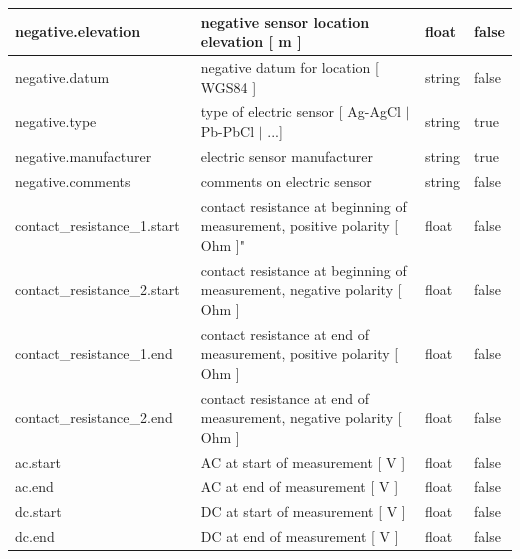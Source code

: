 \documentclass{article}
\begin{document}
\begin{table}[htb!]
\begin{tabular}{|l|p{3in}|l|l|}
        negative.elevation\ & negative sensor location elevation [ m ] & float & false \\ \hline
        negative.datum\ & negative datum for location [ WGS84 ] & string & false \\ \hline
        negative.type\ & type of electric sensor [ Ag-AgCl $|$ Pb-PbCl $|$ ...] & string & true \\ \hline
        negative.manufacturer\ & electric sensor manufacturer & string & true \\ \hline
        negative.comments\ & comments on electric sensor & string & false \\ \hline
        contact\_resistance\_1.start\ & contact resistance at beginning of measurement, positive polarity [ Ohm ]" & float & false \\ \hline
        contact\_resistance\_2.start\ & contact resistance at beginning of measurement, negative polarity [ Ohm ] & float & false \\ \hline
        contact\_resistance\_1.end\ & contact resistance at end of measurement, positive polarity [ Ohm ] & float & false \\ \hline
        contact\_resistance\_2.end\ & contact resistance at end of measurement, negative polarity [ Ohm ] & float & false \\ \hline
        ac.start\ & AC at start of measurement [ V ] & float & false \\ \hline
        ac.end\ & AC at end of measurement [ V ] & float & false \\ \hline
        dc.start\ & DC at start of measurement [ V ] & float & false \\ \hline
        dc.end\ & DC at end of measurement [ V ] & float & false \\ \hline
        
    \end{tabular}
    \label{tab:electric01}
\end{table}    
\end{document}
